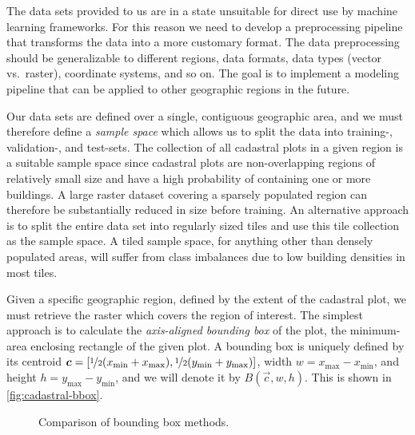 The data sets provided to us are in a state unsuitable for direct use by machine learning frameworks.
For this reason we need to develop a preprocessing pipeline that transforms the data into a more customary format.
The data preprocessing should be generalizable to different regions, data formats, data types (vector vs.\ raster), coordinate systems, and so on.
The goal is to implement a modeling pipeline that can be applied to other geographic regions in the future.

Our data sets are defined over a single, contiguous geographic area, and we must therefore define a \textit{sample space} which allows us to split the data into training-, validation-, and test-sets.
The collection of all cadastral plots in a given region is a suitable sample space since cadastral plots are non-overlapping regions of relatively small size and have a high probability of containing one or more buildings.
A large raster dataset covering a sparsely populated region can therefore be substantially reduced in size before training.
An alternative approach is to split the entire data set into regularly sized tiles and use this tile collection as the sample space.
A tiled sample space, for anything other than densely populated areas, will suffer from class imbalances due to low building densities in most tiles.

Given a specific geographic region, defined by the extent of the cadastral plot, we must retrieve the raster which covers the region of interest.
The simplest approach is to calculate the \textit{axis-aligned bounding box} of the plot, the minimum-area enclosing rectangle of the given plot.
A bounding box is uniquely defined by its centroid $\vec{c} = [\nicefrac{1}{2}(x_{\mathrm{\min}} + x_{\mathrm{\max}}), \nicefrac{1}{2}(y_{\mathrm{\min}} + y_{\mathrm{\max}})]$, width $w = x_{\mathrm{\max}} - x_{\mathrm{\min}}$, and height $h = y_{\mathrm{\max}} - y_{\mathrm{\min}}$, and we will denote it by $B(\vec{c}, w, h)$.
This is shown in \cref{fig:cadastral-bbox}.

\begin{figure}[htb]
  \captionsetup[subfigure]{position=b}
  \centering
  \hspace{2em}
  \caption{Comparison of bounding box methods.}
\end{figure}

